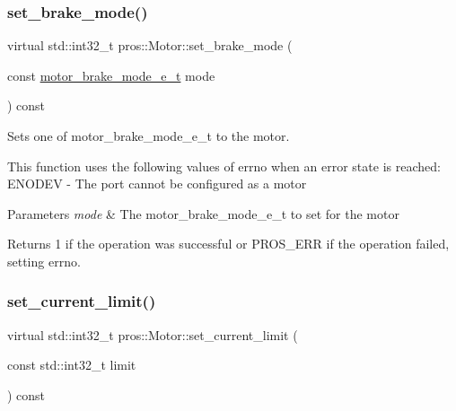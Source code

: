 \subsubsection{\texorpdfstring{set\+\_\+brake\+\_\+mode()}{set\_brake\_mode()}}
{\footnotesize\ttfamily virtual std\+::int32\+\_\+t pros\+::\+Motor\+::set\+\_\+brake\+\_\+mode (\begin{DoxyParamCaption}\item[{const \hyperlink{motors_8h_aa324a2881696428c9e3684f9ad23a83b}{motor\+\_\+brake\+\_\+mode\+\_\+e\+\_\+t}}]{mode }\end{DoxyParamCaption}) const\hspace{0.3cm}{\ttfamily [virtual]}}



Sets one of motor\+\_\+brake\+\_\+mode\+\_\+e\+\_\+t to the motor. 

This function uses the following values of errno when an error state is reached\+: E\+N\+O\+D\+EV -\/ The port cannot be configured as a motor


\begin{DoxyParams}{Parameters}
{\em mode} & The motor\+\_\+brake\+\_\+mode\+\_\+e\+\_\+t to set for the motor\\
\hline
\end{DoxyParams}
\begin{DoxyReturn}{Returns}
1 if the operation was successful or P\+R\+O\+S\+\_\+\+E\+RR if the operation failed, setting errno. 
\end{DoxyReturn}
\mbox{\label{classpros_1_1Motor_a4c496dfb0b33f989d7329a61b7b6d6ba}} 
\subsubsection{\texorpdfstring{set\+\_\+current\+\_\+limit()}{set\_current\_limit()}}
{\footnotesize\ttfamily virtual std\+::int32\+\_\+t pros\+::\+Motor\+::set\+\_\+current\+\_\+limit (\begin{DoxyParamCaption}\item[{const std\+::int32\+\_\+t}]{limit }\end{DoxyParamCaption}) const\hspace{0.3cm}{\ttfamily [virtual]}}



